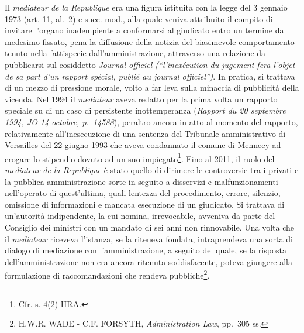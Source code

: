 \documentclass[12pt,it,a4paper,]{report}
\begin{document}
Il \emph{mediateur de la Republique} era una figura istituita con la
legge del 3 gennaio 1973 (art. 11, al.~2) e succ. mod., alla quale
veniva attribuito il compito di invitare l'organo inadempiente a
conformarsi al giudicato entro un termine dal medesimo fissato, pena la
diffusione della notizia del biasimevole comportamento tenuto nella
fattispecie dall'amministrazione, attraverso una relazione da
pubblicarsi sul cosiddetto \emph{Journal officiel (``l'inexécution du
jugement fera l'objet de sa part d'un rapport spécial, publié au journal
officiel'')}. In pratica, si trattava di un mezzo di pressione morale,
volto a far leva sulla minaccia di pubblicità della vicenda. Nel 1994 il
\emph{mediateur} aveva redatto per la prima volta un rapporto speciale
su di un caso di persistente inottemperanza (\emph{Rapport du 20
septembre 1994, JO 14 octobre, p.~14588}), peraltro ancora in atto al
momento del rapporto, relativamente all'inesecuzione di una sentenza del
Tribunale amministrativo di Versailles del 22 giugno 1993 che aveva
condannato il comune di Mennecy ad erogare lo stipendio dovuto ad un suo
impiegato\footnote{Cfr. s. 4(2) HRA.}. Fino al 2011, il ruolo del
\emph{mediateur de la Republique} è stato quello di dirimere le
controversie tra i privati e la pubblica amministrazione sorte in
seguito a disservizi e malfunzionamenti nell'operato di quest'ultima,
quali lentezza del procedimento, errore, silenzio, omissione di
informazioni e mancata esecuzione di un giudicato. Si trattava di
un'autorità indipendente, la cui nomina, irrevocabile, avveniva da parte
del Consiglio dei ministri con un mandato di sei anni non rinnovabile.
Una volta che il \emph{mediateur} riceveva l'istanza, se la riteneva
fondata, intraprendeva una sorta di dialogo di mediazione con
l'amministrazione, a seguito del quale, se la risposta
dell'amministrazione non era ancora ritenuta soddisfacente, poteva
giungere alla formulazione di raccomandazioni che rendeva
pubbliche\footnote{H.W.R. WADE - C.F. FORSYTH, \emph{Administration
  Law}, pp.~305 ss.}.
\end{document}
